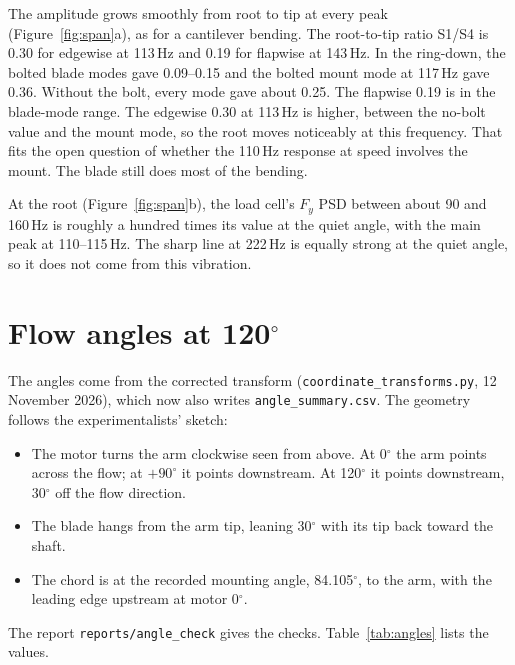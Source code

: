 \documentclass[11pt]{article}
\newcommand{\code}[1]{\texttt{#1}}
\begin{document}
The amplitude grows smoothly from root to tip at every peak
(Figure~\ref{fig:span}a), as for a cantilever bending. The root-to-tip ratio
S1/S4 is 0.30 for edgewise at 113\,Hz and 0.19 for flapwise at 143\,Hz.
In the ring-down, the bolted blade modes gave 0.09--0.15 and the bolted
mount mode at 117\,Hz gave 0.36. Without the bolt, every mode gave about
0.25. The flapwise 0.19 is in the blade-mode range. The edgewise 0.30 at
113\,Hz is higher, between the no-bolt value and the mount mode, so the root
moves noticeably at this frequency. That fits the open question of whether
the 110\,Hz response at speed involves the mount. The blade still does most
of the bending.

At the root (Figure~\ref{fig:span}b), the load cell's $F_y$ PSD between
about 90 and 160\,Hz is roughly a hundred times its value at the quiet
angle, with the main peak at 110--115\,Hz. The sharp line at 222\,Hz is
equally strong at the quiet angle, so it does not come from this vibration.

\section{Flow angles at 120$^\circ$}
\label{sec:angles}

The angles come from the corrected transform
(\code{coordinate\_transforms.py}, 12 November 2026), which now also
writes \code{angle\_summary.csv}. The geometry follows the
experimentalists' sketch:
\begin{itemize}
  \item The motor turns the arm clockwise seen from above. At 0$^\circ$
        the arm points across the flow; at $+90^\circ$ it points
        downstream. At 120$^\circ$ it points downstream, 30$^\circ$ off
        the flow direction.
  \item The blade hangs from the arm tip, leaning 30$^\circ$ with its tip
        back toward the shaft.
  \item The chord is at the recorded mounting angle, 84.105$^\circ$, to the
        arm, with the leading edge upstream at motor 0$^\circ$.
\end{itemize}
The report \code{reports/angle\_check} gives the checks. Table~\ref{tab:angles}
lists the values.
\end{document}
